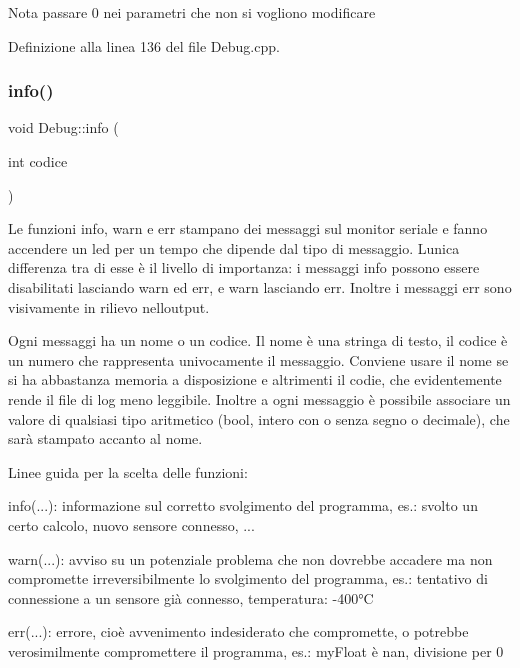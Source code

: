 \begin{DoxyNote}{Nota}
passare 0 nei parametri che non si vogliono modificare 
\end{DoxyNote}


Definizione alla linea 136 del file Debug.\+cpp.

\mbox{\label{class_debug_a9e8eec71718abfd7cca293c81bbd3409}} 
\subsubsection{\texorpdfstring{info()}{info()}}
{\footnotesize\ttfamily void Debug\+::info (\begin{DoxyParamCaption}\item[{int}]{codice }\end{DoxyParamCaption})\hspace{0.3cm}{\ttfamily [inline]}}

Le funzioni {\ttfamily info}, {\ttfamily warn} e {\ttfamily err} stampano dei messaggi sul monitor seriale e fanno accendere un led per un tempo che dipende dal tipo di messaggio. L\textquotesingle{}unica differenza tra di esse è il livello di importanza\+: i messaggi info possono essere disabilitati lasciando warn ed err, e warn lasciando err. Inoltre i messaggi err sono visivamente in rilievo nell\textquotesingle{}output.

Ogni messaggi ha un nome o un codice. Il nome è una stringa di testo, il codice è un numero che rappresenta univocamente il messaggio. Conviene usare il nome se si ha abbastanza memoria a disposizione e altrimenti il codie, che evidentemente rende il file di log meno leggibile. Inoltre a ogni messaggio è possibile associare un valore di qualsiasi tipo aritmetico (bool, intero con o senza segno o decimale), che sarà stampato accanto al nome.

Linee guida per la scelta delle funzioni\+:
\begin{DoxyItemize}
\item {\ttfamily info(...)}\+: informazione sul corretto svolgimento del programma, es.\+: svolto un certo calcolo, nuovo sensore connesso, ...
\item {\ttfamily warn(...)}\+: avviso su un potenziale problema che non dovrebbe accadere ma non compromette irreversibilmente lo svolgimento del programma, es.\+: tentativo di connessione a un sensore già connesso, temperatura\+: -\/400°C
\item {\ttfamily err(...)}\+: errore, cioè avvenimento indesiderato che compromette, o potrebbe verosimilmente compromettere il programma, es.\+: my\+Float è nan, divisione per 0 
\end{DoxyItemize}

